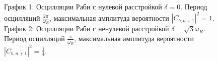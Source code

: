 \begin{figure}
\centering



\caption{График 1: Осцилляции Раби с нулевой расстройкой $\delta = 0$. Период
  осцилляций $\frac{2 \pi}{\omega_R}$, максимальная амплитуда
  вероятности $\left|C_{b,n+1}\right|^2 = 1$.
  График 2: Осцилляции Раби с ненулевой расстройкой $\delta =
  \sqrt{3}\omega_R$. 
  Период осцилляций $\frac{\pi}{\omega_R}$, максимальная амплитуда
  вероятности $\left|C_{b,n+1}\right|^2 = \frac{1}{4}$.}
\label{figPart1InteractionRabiDelta}
\end{figure}
